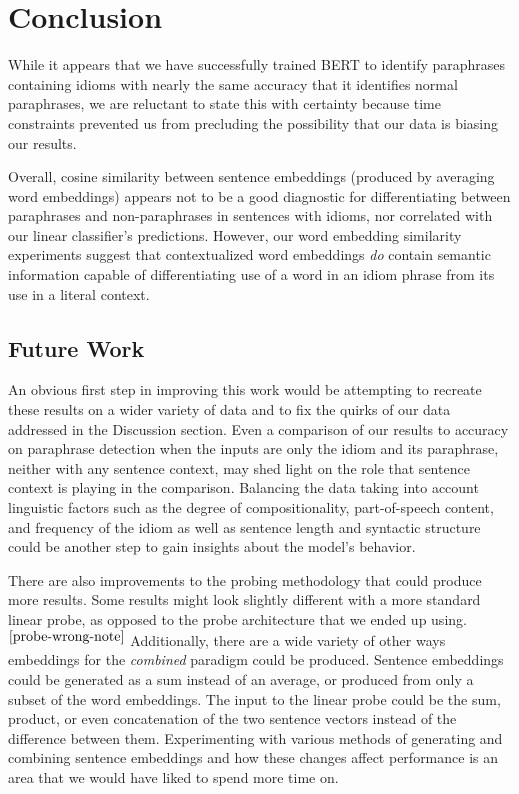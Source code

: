 \documentclass[11pt,a4paper]{article}
\begin{document}
\section{Conclusion}

While it appears that we have successfully trained BERT to identify paraphrases containing idioms with nearly the same accuracy that it identifies normal paraphrases, we are reluctant to state this with certainty because time constraints prevented us from precluding the possibility that our data is biasing our results.

Overall, cosine similarity between sentence embeddings (produced by averaging word embeddings) appears not to be a good diagnostic for differentiating between paraphrases and non-paraphrases in sentences with idioms, nor correlated with our linear classifier's predictions. However, our word embedding similarity experiments suggest that contextualized word embeddings \textit{do} contain semantic information capable of differentiating use of a word in an idiom phrase from its use in a literal context.



\subsection{Future Work}

An obvious first step in improving this work would be attempting to recreate these results on a wider variety of data and to fix the quirks of our data addressed in the Discussion section. Even a comparison of our results to accuracy on paraphrase detection when the inputs are only the idiom and its paraphrase, neither with any sentence context, may shed light on the role that sentence context is playing in the comparison. Balancing the data taking into account linguistic factors such as the degree of compositionality, part-of-speech content, and frequency of the idiom as well as sentence length and syntactic structure could be another step to gain insights about the model's behavior.

There are also improvements to the probing methodology that could produce more results. Some results might look slightly different with a more standard linear probe, as opposed to the probe architecture that we ended up using.$^{\ref{probe-wrong-note}}$ Additionally, there are a wide variety of other ways  embeddings for the \textit{combined} paradigm could be produced. Sentence embeddings could be generated as a sum instead of an average, or produced from only a subset of the word embeddings. The input to the linear probe could be the sum, product, or even concatenation of the two sentence vectors instead of the difference between them. Experimenting with various methods of generating and combining sentence embeddings and how these changes affect performance is an area that we would have liked to spend more time on. 
\end{document}
